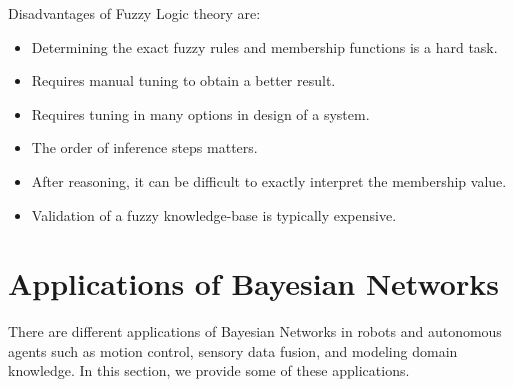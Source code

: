 \documentclass[11pt]{article}
\begin{document}
\noindent Disadvantages of Fuzzy Logic theory are:

\begin{itemize}
  \item Determining the exact fuzzy rules and membership functions is a hard
  task.
  \item Requires manual tuning to obtain a better result.
  \item Requires tuning in many options in design of a system.
  \item The order of inference steps matters.
  \item After reasoning, it can be difficult to exactly interpret the membership
  value.
  \item Validation of a fuzzy knowledge-base is typically expensive.
\end{itemize}

\section{Applications of Bayesian Networks}
\label{sec:applications}

There are different applications of Bayesian Networks in robots and autonomous
agents such as motion control, sensory data fusion, and modeling domain
knowledge. In this section, we provide some of these applications.
\end{document}
